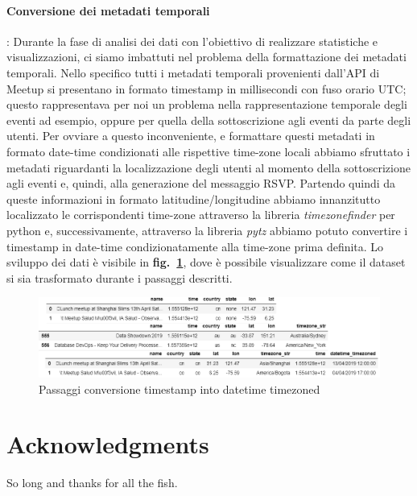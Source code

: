 \documentclass[fleqn,10pt]{SelfArx} %
\begin{document}
{\paragraph{Conversione dei metadati temporali}: Durante la fase di analisi dei dati con l'obiettivo di realizzare statistiche e visualizzazioni, ci siamo imbattuti nel problema della formattazione dei metadati temporali. Nello specifico tutti i metadati temporali provenienti dall'API di Meetup si presentano in formato timestamp in millisecondi con fuso orario UTC; questo rappresentava per noi un problema nella rappresentazione temporale degli eventi ad esempio, oppure per quella della sottoscrizione agli eventi da parte degli utenti. Per ovviare a questo inconveniente, e formattare questi metadati in formato date-time condizionati alle rispettive time-zone locali abbiamo sfruttato i metadati riguardanti la localizzazione degli utenti al momento della sottoscrizione agli eventi e, quindi, alla generazione del messaggio RSVP. Partendo quindi da queste informazioni in formato latitudine/longitudine abbiamo innanzitutto localizzato le corrispondenti time-zone attraverso la libreria \textit{timezonefinder} per python e, successivamente, attraverso la libreria \textit{pytz} abbiamo potuto convertire i timestamp in date-time condizionatamente alla time-zone prima definita. Lo sviluppo dei dati è visibile in \textbf{fig.~\ref{datetime_timezoned}}, dove è possibile visualizzare come il dataset si sia trasformato durante i passaggi descritti.
\begin{figure}
\centering
\includegraphics[width = 9 cm, height = 3.5 cm]{datetime_timezoned.png}
\caption{\label{datetime_timezoned} Passaggi conversione timestamp into datetime timezoned}
\end{figure}
}
\section*{Acknowledgments} %


So long and thanks for all the fish.




\end{document}
